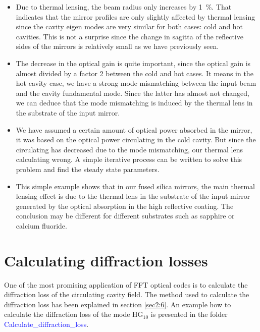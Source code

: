 \begin{itemize}
  \item Due to thermal lensing, the beam radius only increases by 1~\%. That indicates that the mirror profiles are only slightly affected by thermal lensing since the cavity eigen modes are very similar for both cases: cold and hot cavities. This is not a surprise since the change in sagitta of the reflective sides of the mirrors is relatively small as we have previously seen.
  \item The decrease in the optical gain is quite important, since the optical gain is almost divided by a factor 2 between the cold and hot cases. It means in the hot cavity case, we have a strong mode mismatching between the input beam and the cavity fundamental mode. Since the latter has almost not changed, we can deduce that the mode mismatching is induced by the thermal lens in the substrate of the input mirror.
  \item We have assumed a certain amount of optical power absorbed in the mirror, it was based on the optical power circulating in the cold cavity. But since the circulating has decreased due to the mode mismatching, our thermal lens calculating wrong. A simple iterative process can be written to solve this problem and find the steady state parameters.
  \item This simple example shows that in our fused silica mirrors, the main thermal lensing effect is due to the thermal lens in the substrate of the input mirror generated by the optical absorption in the high reflective coating. The conclusion may be different for different substrates such as sapphire or calcium fluoride.
\end{itemize}

\section{Calculating diffraction losses}
\label{cha3.2}

One of the most promising application of FFT optical codes is to calculate the diffraction loss of the circulating cavity field. The method used to calculate the diffraction loss has been explained in section \ref{sec2:6}. An example how to calculate the diffraction loss of the mode HG$_{10}$ is presented in the folder \textcolor{blue}{Calculate\_diffraction\_loss}.

